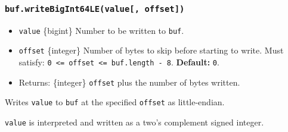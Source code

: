 \begin{Shaded}
\begin{Highlighting}[]
\NormalTok{ \{ }\NormalTok{ \} }\OperatorTok{=} \NormalTok{(}\NormalTok{)}\OperatorTok{;}

\OperatorTok{=} \NormalTok{(}\NormalTok{)}\OperatorTok{;}

\NormalTok{(}\OperatorTok{,} \NormalTok{)}\OperatorTok{;}

\OperatorTok{;}
\end{Highlighting}
\end{Shaded}

\subsubsection{\texorpdfstring{\texttt{buf.writeBigInt64LE(value{[},\ offset{]})}}{buf.writeBigInt64LE(value{[}, offset{]})}}\label{buf.writebigint64levalue-offset}

\begin{itemize}
\tightlist
\item
  \texttt{value} \{bigint\} Number to be written to \texttt{buf}.
\item
  \texttt{offset} \{integer\} Number of bytes to skip before starting to
  write. Must satisfy:
  \texttt{0\ \textless{}=\ offset\ \textless{}=\ buf.length\ -\ 8}.
  \textbf{Default:} \texttt{0}.
\item
  Returns: \{integer\} \texttt{offset} plus the number of bytes written.
\end{itemize}

Writes \texttt{value} to \texttt{buf} at the specified \texttt{offset}
as little-endian.

\texttt{value} is interpreted and written as a two's complement signed
integer.

